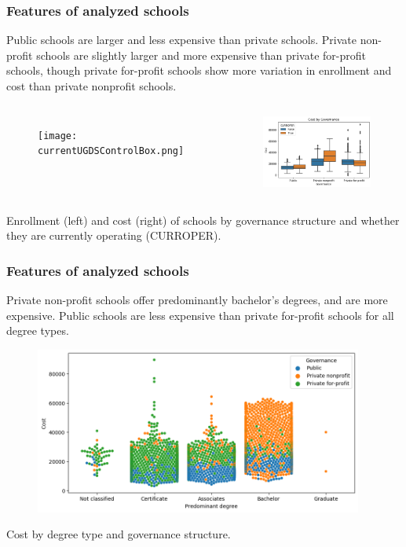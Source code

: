 \documentclass{beamer}
\begin{document}
\begin{frame} 
\frametitle{Features of analyzed schools}
Public schools are larger and less expensive than private schools. Private non-profit schools are slightly larger and more expensive than private for-profit schools, though private for-profit schools show more variation in enrollment and cost than private nonprofit schools.

\begin{columns}
\column{2in}
\begin{figure}
\texttt{[image: currentUGDSControlBox.png]}
\end{figure}
\column{2in}
\begin{figure}
\includegraphics[width=2in]{currentCostGovBox.png}
\end{figure}
\end{columns}
\begin{center}
Enrollment (left) and cost (right) of schools by governance structure and whether they are currently operating (CURROPER).  \end{center}
\end{frame}
\begin{frame} 
\frametitle{Features of analyzed schools}
Private non-profit schools offer predominantly bachelor's degrees, and are more expensive. Public schools are less expensive than private for-profit schools for all degree types.

\begin{center}
\begin{figure}
\includegraphics[width=4.25in]{currentPriceDegreeSwarm.png}
\end{figure}
Cost by degree type and governance structure.
\end{center}
\end{frame}
\end{document}
